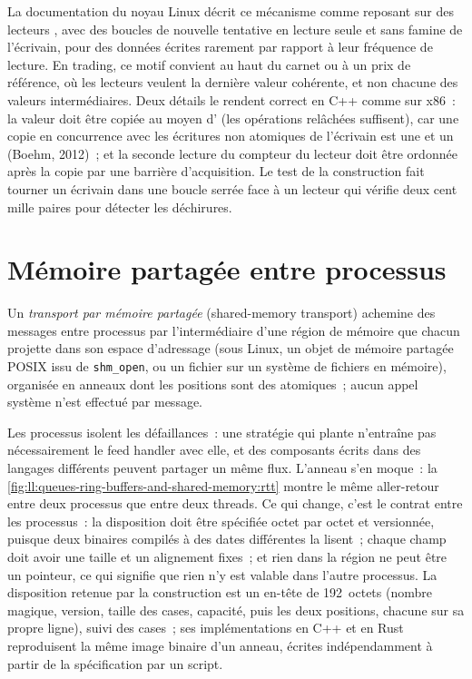 La documentation du noyau Linux décrit ce mécanisme comme reposant sur des lecteurs , avec des boucles de nouvelle tentative en lecture seule
et sans famine de l'écrivain, pour des données écrites rarement par rapport à leur fréquence de lecture. En trading, ce motif convient au haut du carnet
ou à un prix de référence, où les lecteurs veulent la dernière valeur cohérente, et non chacune des valeurs intermédiaires. Deux détails le rendent correct
en C++ comme sur x86~: la valeur doit être copiée au moyen d' (les opérations relâchées suffisent), car une copie en concurrence avec
les écritures non atomiques de l'écrivain est une  et un  (Boehm, 2012)~; et la seconde lecture du compteur
du lecteur doit être ordonnée après la copie par une barrière d'acquisition. Le test de la construction fait tourner un écrivain dans une boucle serrée
face à un lecteur qui vérifie deux cent mille paires pour détecter les déchirures.

\section{Mémoire partagée entre processus}

\begin{definition}\label{def:ll:queues-ring-buffers-and-shared-memory:shm}
Un \emph{transport par mémoire partagée} (shared-memory transport) achemine des messages entre processus par l'intermédiaire d'une région de mémoire
que chacun projette dans son espace d'adressage (sous Linux, un objet de mémoire partagée POSIX issu de \texttt{shm\_open}, ou un fichier sur un
système de fichiers en mémoire), organisée en anneaux dont les positions sont des atomiques~; aucun appel système n'est effectué par message.
\end{definition}

Les processus isolent les défaillances~: une stratégie qui plante n'entraîne pas nécessairement le feed handler avec elle, et des composants écrits dans
des langages différents peuvent partager un même flux. L'anneau s'en moque~: la \cref{fig:ll:queues-ring-buffers-and-shared-memory:rtt} montre
le même aller-retour entre deux processus que entre deux threads. Ce qui change, c'est le contrat entre les processus~: la disposition doit être spécifiée
octet par octet et versionnée, puisque deux binaires compilés à des dates différentes la lisent~; chaque champ doit avoir une taille et un alignement fixes~;
et rien dans la région ne peut être un pointeur, ce qui signifie que rien n'y est valable dans l'autre processus.
La disposition retenue par la construction est un en-tête de 192~octets (nombre magique, version, taille des cases, capacité, puis les deux positions,
chacune sur sa propre ligne), suivi des cases~; ses implémentations en C++ et en Rust reproduisent la même image binaire d'un anneau, écrites
indépendamment à partir de la spécification par un script.

